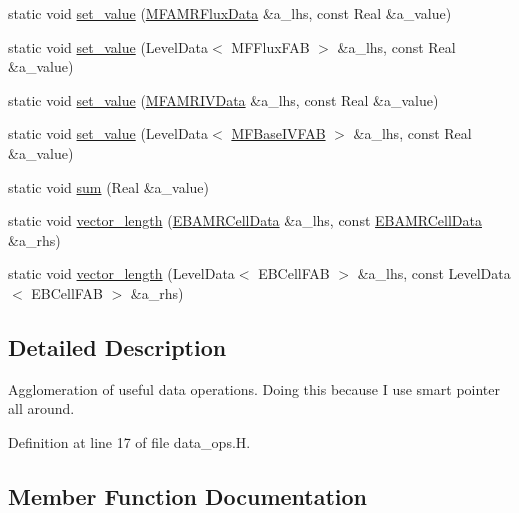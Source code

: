 \begin{DoxyCompactItemize}
\item 
static void \hyperlink{classdata__ops_a2e4c4516a5a938039f48bf6c1ea6919e}{set\+\_\+value} (\hyperlink{type__definitions_8H_a4033d82364b7e6655b58257749d7881f}{M\+F\+A\+M\+R\+Flux\+Data} \&a\+\_\+lhs, const Real \&a\+\_\+value)
\item 
static void \hyperlink{classdata__ops_af1abf9a925d68d7855b645d5b6a69c88}{set\+\_\+value} (Level\+Data$<$ M\+F\+Flux\+F\+AB $>$ \&a\+\_\+lhs, const Real \&a\+\_\+value)
\item 
static void \hyperlink{classdata__ops_a0759a4af2ce120c7992992c9240e4eda}{set\+\_\+value} (\hyperlink{type__definitions_8H_a559707b00625e419df1a59d9501220de}{M\+F\+A\+M\+R\+I\+V\+Data} \&a\+\_\+lhs, const Real \&a\+\_\+value)
\item 
static void \hyperlink{classdata__ops_a467e474878a67fa021d4a24880517347}{set\+\_\+value} (Level\+Data$<$ \hyperlink{classMFBaseIVFAB}{M\+F\+Base\+I\+V\+F\+AB} $>$ \&a\+\_\+lhs, const Real \&a\+\_\+value)
\item 
static void \hyperlink{classdata__ops_a8e73756f2db425dab61d7025470f2147}{sum} (Real \&a\+\_\+value)
\item 
static void \hyperlink{classdata__ops_a910df2ab30326110bd712fc86cf09269}{vector\+\_\+length} (\hyperlink{type__definitions_8H_a7e610f301989e5e07781c5e338bdb7c3}{E\+B\+A\+M\+R\+Cell\+Data} \&a\+\_\+lhs, const \hyperlink{type__definitions_8H_a7e610f301989e5e07781c5e338bdb7c3}{E\+B\+A\+M\+R\+Cell\+Data} \&a\+\_\+rhs)
\item 
static void \hyperlink{classdata__ops_a7a5c574ad799dbbc8e8d3777b94e98d6}{vector\+\_\+length} (Level\+Data$<$ E\+B\+Cell\+F\+AB $>$ \&a\+\_\+lhs, const Level\+Data$<$ E\+B\+Cell\+F\+AB $>$ \&a\+\_\+rhs)
\end{DoxyCompactItemize}


\subsection{Detailed Description}
Agglomeration of useful data operations. Doing this because I use smart pointer all around. 

Definition at line 17 of file data\+\_\+ops.\+H.



\subsection{Member Function Documentation}
